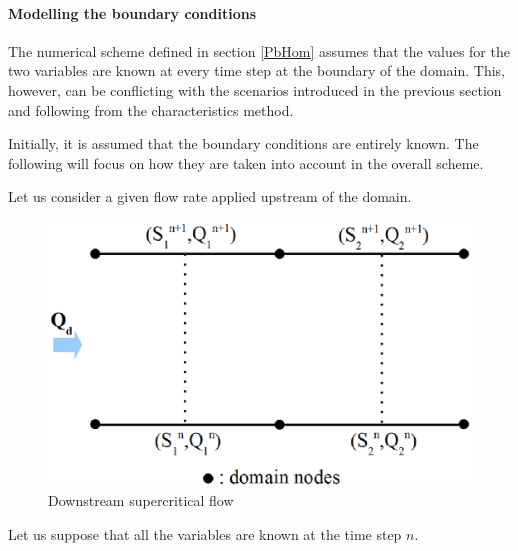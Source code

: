 \paragraph{Modelling the boundary conditions\\}

\hspace*{1cm}

The numerical scheme defined in section \ref{PbHom} assumes that the values for the two variables are known at every time step at the boundary of the domain. This, however, can be conflicting with the scenarios introduced in the previous section and following from the characteristics method.

\vspace{0.5cm}

Initially, it is assumed that the boundary conditions are entirely known. The following will focus on how they are taken into account in the overall scheme.

\vspace{0.5cm}

Let us consider a given flow rate applied upstream of the domain.

\begin{figure}
 \begin{center}
  \includegraphics[scale=0.8]{Figures/NDomaine.eps}
  \caption{Downstream supercritical flow}
 \end{center}
\end{figure}

Let us suppose that all the variables are known at the time step $n$.

\vspace{0.5cm}

